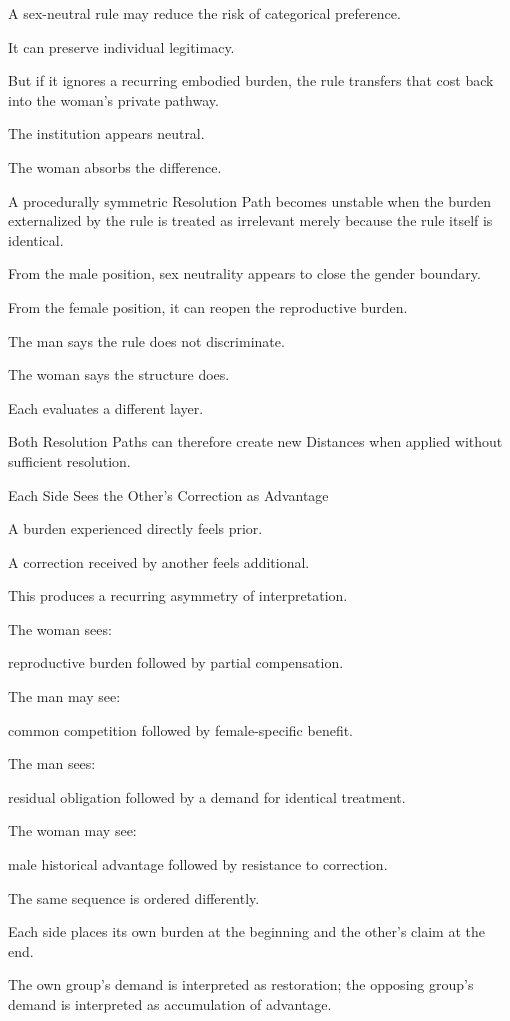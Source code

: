 A sex-neutral rule may reduce the risk of categorical preference.

It can preserve individual legitimacy.

But if it ignores a recurring embodied burden, the rule transfers that cost back into the woman’s private pathway.

The institution appears neutral.

The woman absorbs the difference.

A procedurally symmetric Resolution Path becomes unstable when the burden externalized by the rule is treated as irrelevant merely because the rule itself is identical.

From the male position, sex neutrality appears to close the gender boundary.

From the female position, it can reopen the reproductive burden.

The man says the rule does not discriminate.

The woman says the structure does.

Each evaluates a different layer.

Both Resolution Paths can therefore create new Distances when applied without sufficient resolution.

Each Side Sees the Other’s Correction as Advantage

A burden experienced directly feels prior.

A correction received by another feels additional.

This produces a recurring asymmetry of interpretation.

The woman sees:

reproductive burden
followed by
partial compensation.

The man may see:

common competition
followed by
female-specific benefit.

The man sees:

residual obligation
followed by
a demand for identical treatment.

The woman may see:

male historical advantage
followed by
resistance to correction.

The same sequence is ordered differently.

Each side places its own burden at the beginning and the other’s claim at the end.

The own group’s demand is interpreted as restoration; the opposing group’s demand is interpreted as accumulation of advantage.

